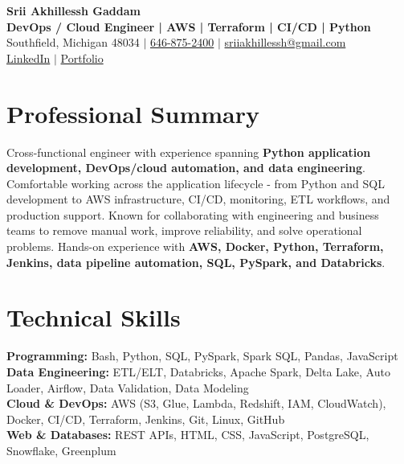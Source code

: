 \documentclass[letterpaper,10pt]{article}
\begin{document}
\fontsize{9.35pt}{10.45pt}\selectfont

\begin{center}
    {\LARGE \textbf{Srii Akhillessh Gaddam}} \\[-1pt]
    \textbf{DevOps / Cloud Engineer | AWS | Terraform | CI/CD | Python} \\[2pt]
    Southfield, Michigan 48034 $|$
    \href{tel:6468752400}{646-875-2400} $|$
    \href{mailto:sriiakhillessh@gmail.com}{sriiakhillessh@gmail.com} \\[1pt]
    \href{https://www.linkedin.com/in/srii-akhiilessh-gaddam-b48668191/}{LinkedIn} $|$
    \href{https://sriiakhillesshg.github.io/portfolio/}{Portfolio}
\end{center}
\vspace{-8pt}

\section{Professional Summary}
\small{Cross-functional engineer with experience spanning \textbf{Python application development, DevOps/cloud automation, and data engineering}. Comfortable working across the application lifecycle - from Python and SQL development to AWS infrastructure, CI/CD, monitoring, ETL workflows, and production support. Known for collaborating with engineering and business teams to remove manual work, improve reliability, and solve operational problems. Hands-on experience with \textbf{AWS, Docker, Python, Terraform, Jenkins, data pipeline automation, SQL, PySpark, and Databricks}.}

\section{Technical Skills}
\small{
\textbf{Programming:} Bash, Python, SQL, PySpark, Spark SQL, Pandas, JavaScript \\
\textbf{Data Engineering:} ETL/ELT, Databricks, Apache Spark, Delta Lake, Auto Loader, Airflow, Data Validation, Data Modeling \\
\textbf{Cloud \& DevOps:} AWS (S3, Glue, Lambda, Redshift, IAM, CloudWatch), Docker, CI/CD, Terraform, Jenkins, Git, Linux, GitHub \\
\textbf{Web \& Databases:} REST APIs, HTML, CSS, JavaScript, PostgreSQL, Snowflake, Greenplum
}
\end{document}
